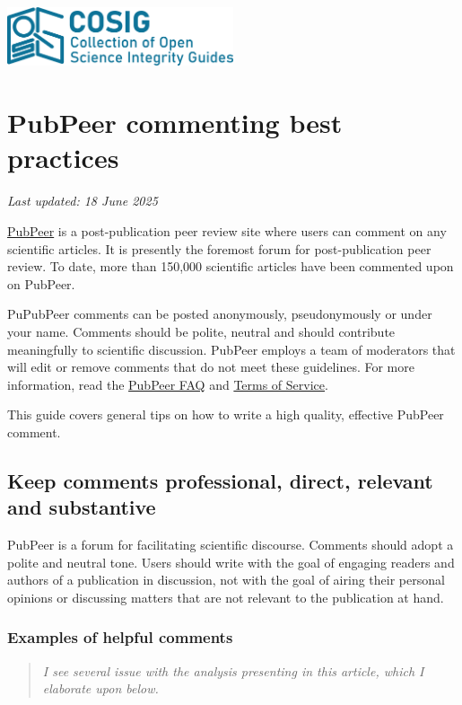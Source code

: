 \documentclass[letterpaper, 12pt]{article}
\begin{document}
\flushleft
\includegraphics[width=0.5\textwidth]{img/home/241017_final_logo_mockup.png}

\section*{PubPeer commenting best practices}
\textit{Last updated: 18 June 2025}

\href{https://pubpeer.com/}{PubPeer} is a post-publication peer review site where users can comment on any scientific articles. It is presently the foremost forum for post-publication peer review. To date, more than 150,000 scientific articles have been commented upon on PubPeer.

PuPubPeer comments can be posted anonymously, pseudonymously or under your name. Comments should be polite, neutral and should contribute meaningfully to scientific discussion. PubPeer employs a team of moderators that will edit or remove comments that do not meet these guidelines. For more information, read the \href{https://pubpeer.com/static/faq}{PubPeer FAQ} and \href{https://pubpeer.com/static/tos}{Terms of Service}.

This guide covers general tips on how to write a high quality, effective PubPeer comment.

\subsection*{Keep comments professional, direct, relevant and substantive}

PubPeer is a forum for facilitating scientific discourse. Comments should adopt a polite and neutral tone. Users should write with the goal of engaging readers and authors of a publication in discussion, not with the goal of airing their personal opinions or discussing matters that are not relevant to the publication at hand.

\subsubsection*{Examples of helpful comments}

\begin{quote}
    \textit{I see several issue with the analysis presenting in this article, which I elaborate upon below.}
\end{quote}
\end{document}
